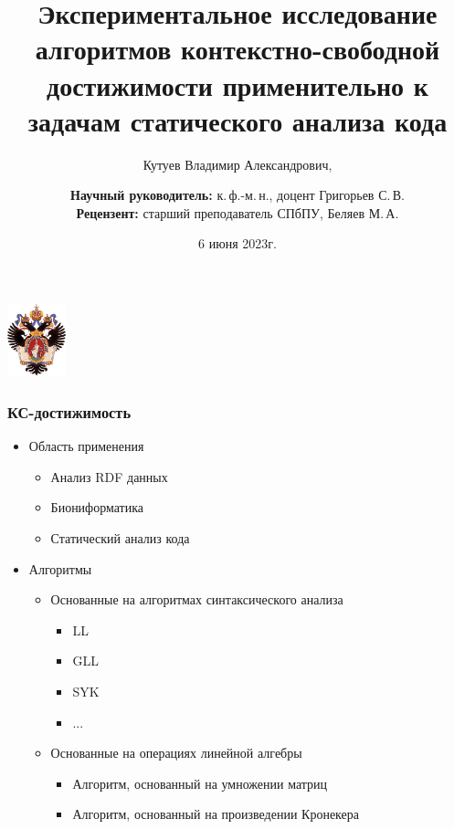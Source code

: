 \documentclass[x11names,dvipsnames,table,aspectratio=169]{beamer}
\title[]{Экспериментальное исследование алгоритмов контекстно-свободной достижимости применительно к задачам статического анализа кода}
\institute[СПбГУ]{
Санкт-Петербургский государственный университет \\
Кафедра системного программирования }
\author[Владимир Кутуев]{Кутуев Владимир Александрович,  \\
  \and  
    {\bfseries Научный руководитель:} к.\,ф.-м.\,н., доцент Григорьев С.\,В. \\ 
    {\bfseries Рецензент:} старший преподаватель СПбПУ, Беляев М.\,А. \\ 
}
\date{6 июня 2023г.}
\begin{document}
{
\begin{frame}
    \begin{center}
        \includegraphics[width=1.7cm]{pictures/SPbGU_Logo.png}
    \end{center}
    \titlepage
\end{frame}
}

\begin{frame}[fragile]
  \transwipe[direction=90]
  \frametitle{КС-достижимость}
  \begin{itemize}
    \item Область применения
    \begin{itemize}
        \item Анализ RDF данных
        \item Биониформатика
        \item Статический анализ кода
    \end{itemize}
    \item Алгоритмы
    \begin{itemize}
        \item Основанные на алгоритмах синтаксического анализа
        \begin{itemize}
            \item LL
            \item GLL
            \item SYK
            \item ...
        \end{itemize}
        \item Основанные на операциях линейной алгебры
        \begin{itemize}
            \item Алгоритм, основанный на умножении матриц
            \item Алгоритм, основанный на произведении Кронекера
        \end{itemize}
    \end{itemize}
  \end{itemize}
  
\end{frame}
\end{document}
